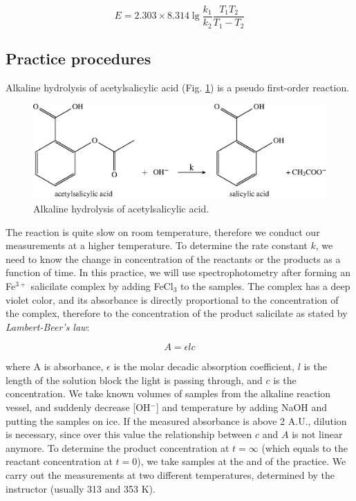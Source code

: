 \begin{equation}
	E
	=
	2.303
	\times
	8.314
	\lg
	\frac{k_1}{k_2}
	\frac{T_1 T_2}{T_1-T_2}
\end{equation}

\subsection{Practice procedures}

Alkaline hydrolysis of acetylsalicylic acid (Fig. \ref{fig:salicilsav}) is a pseudo first-order reaction. 
\begin{figure}
\centering
\includegraphics[width=1\textwidth]{fig/asa_hydrolysis.eps}
\caption{Alkaline hydrolysis of acetylsalicylic acid.}
\label{fig:salicilsav}
\end{figure}
The reaction is quite slow on room temperature, therefore we conduct our measurements at a higher temperature.
To determine the rate constant $k$, we need to know the change in concentration of the reactants or the products as a function of time.
In this practice, we will use spectrophotometry after forming an Fe$^{3+}$ salicilate complex by adding FeCl$_3$ to the samples. The complex has a deep violet color, and its absorbance is directly proportional to the concentration of the complex, therefore to the concentration of the product salicilate as stated by \emph{Lambert-Beer's law}:

\begin{equation}
\label{eq:beer}
        A
        =
	\epsilon
	l
	c
\end{equation}

where A is absorbance, $\epsilon$ is the molar decadic absorption coefficient, $l$ is the length of the solution block the light is passing through, and $c$ is the concentration.
We take known volumes of samples from the alkaline reaction vessel, and suddenly decrease [OH$^-$] and temperature by adding NaOH and putting the samples on ice.
If the measured absorbance is above 2 A.U., dilution is necessary, since over this value the relationship between $c$ and $A$ is not linear anymore. To determine the product concentration at $t = \infty$ (which equals to the reactant concentration at $t = 0$), we take samples at the and of the practice. We carry out the measurements at two different temperatures, determined by the instructor (usually 313 and 353 K).

